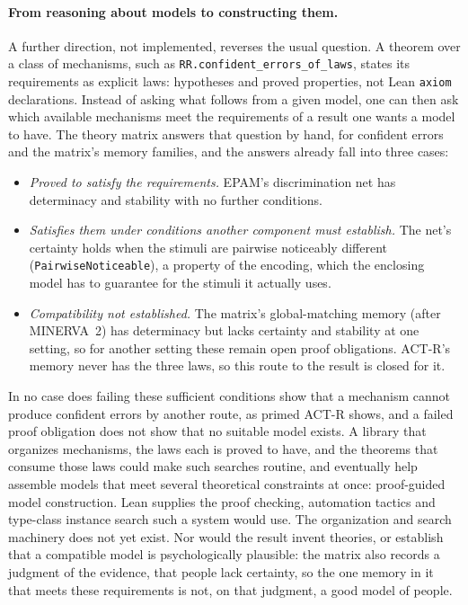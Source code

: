 \documentclass[11pt]{article}
\newcommand{\code}[1]{\texttt{#1}}
\newcommand{\lean}[1]{\texttt{#1}}
\begin{document}
\paragraph{From reasoning about models to constructing them.} A further direction, not implemented, reverses the usual question. A theorem over a class of mechanisms, such as \lean{RR.confident\_errors\_of\_laws}, states its requirements as explicit laws: hypotheses and proved properties, not Lean \code{axiom} declarations. Instead of asking what follows from a given model, one can then ask which available mechanisms meet the requirements of a result one wants a model to have. The theory matrix answers that question by hand, for confident errors and the matrix's memory families, and the answers already fall into three cases:
\begin{itemize}
  \item \emph{Proved to satisfy the requirements.} EPAM's discrimination net has determinacy and stability with no further conditions.
  \item \emph{Satisfies them under conditions another component must establish.} The net's certainty holds when the stimuli are pairwise noticeably different (\code{PairwiseNoticeable}), a property of the encoding, which the enclosing model has to guarantee for the stimuli it actually uses.
  \item \emph{Compatibility not established.} The matrix's global-matching memory (after MINERVA~2) has determinacy but lacks certainty and stability at one setting, so for another setting these remain open proof obligations. ACT-R's memory never has the three laws, so this route to the result is closed for it.
\end{itemize}
In no case does failing these sufficient conditions show that a mechanism cannot produce confident errors by another route, as primed ACT-R shows, and a failed proof obligation does not show that no suitable model exists. A library that organizes mechanisms, the laws each is proved to have, and the theorems that consume those laws could make such searches routine, and eventually help assemble models that meet several theoretical constraints at once: proof-guided model construction. Lean supplies the proof checking, automation tactics and type-class instance search such a system would use. The organization and search machinery does not yet exist. Nor would the result invent theories, or establish that a compatible model is psychologically plausible: the matrix also records a judgment of the evidence, that people lack certainty, so the one memory in it that meets these requirements is not, on that judgment, a good model of people.
\end{document}

